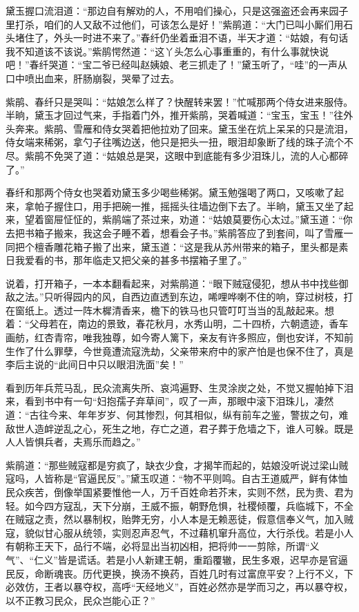 \documentclass[12pt,oneside]{book}
\begin{document}
黛玉握口流泪道：“那边自有解劝的人，不用咱们操心，只是这强盗还会再来园子里打杀，咱们的人又敌不过他们，可该怎么是好！”紫鹃道：“大门已叫小厮们用石头堵住了，外头一时进不来了。”春纤仍坐着垂泪不语，半天才道：“姑娘，有句话我不知道该不该说。”紫鹃愕然道：“这丫头怎么心事重重的，有什么事就快说吧！”春纤哭道：“宝二爷已经叫赵姨娘、老三抓走了！”黛玉听了，“哇”的一声从口中喷出血来，肝肠崩裂，哭晕了过去。

紫鹃、春纤只是哭叫：“姑娘怎么样了？快醒转来罢！”忙喊那两个侍女进来服侍。半晌，黛玉才回过气来，手指着门外，推开紫鹃，哭着喊道：“宝玉，宝玉！”往外头奔来。紫鹃、雪雁和侍女哭着把他拉劝了回来。黛玉坐在炕上呆呆的只是流泪，侍女端来稀粥，拿勺子往嘴边送，他只是把头一扭，眼泪却象断了线的珠子流个不尽。紫鹃不免哭了道：“姑娘总是哭，这眼中到底能有多少泪珠儿，流的人心都碎了。”

春纤和那两个侍女也哭着劝黛玉多少喝些稀粥。黛玉勉强喝了两口，又咳嗽了起来，拿帕子握住口，用手把碗一推，摇摇头往墙边倒下去了。半晌，黛玉又坐了起来，望着窗屉怔怔的，紫鹃端了茶过来，劝道：“姑娘莫要伤心太过。”黛玉道：“你去把书箱子搬来，我这会子睡不着，想看会子书。”紫鹃答应了到套间，叫了雪雁一同把个檀香雕花箱子搬了出来，黛玉道：“这是我从苏州带来的箱子，里头都是素日我爱看的书，那年临走又把父亲的甚多书摆箱子里了。”

说着，打开箱子，一本本翻看起来，对紫鹃道：“眼下贼寇侵犯，想从书中找些御敌之法。”只听得园内的风，自西边直透到东边，唏哩哗喇不住的响，穿过树枝，打在窗纸上。透过一阵木樨清香来，檐下的铁马也只管叮叮当当的乱敲起来。想着：“父母若在，南边的景致，春花秋月，水秀山明，二十四桥，六朝遗迹，香车画舫，红杏青帘，唯我独尊，如今寄人篱下，亲友有许多照应，倒也安详，不知前生作了什么罪孽，今世竟遭流寇洗劫，父亲带来府中的家产怕是也保不住了，真是李后主说的“此间日中只以眼泪洗面”矣！”

看到历年兵荒马乱，民众流离失所、哀鸿遍野、生灵涂炭之处，不觉又握帕掉下泪来，看到书中有一句“妇抱孺子弃草间”，叹了一声，那眼中滚下泪珠儿，凄然道：“古往今来、年年岁岁、何其惨烈，何其相似，纵有前车之鉴，警拔之句，难敌世人造衅逆乱之心，死生之地，存亡之道，君子葬于危墙之下，谁人可躲。既是人人皆惧兵者，夫焉乐而趋之。”

紫鹃道：“那些贼寇都是穷疯了，缺衣少食，才揭竿而起的，姑娘没听说过梁山贼寇吗，人皆称是“官逼民反”。”黛玉叹道：“物不平则鸣。自古王道威严，鲜有体恤民众疾苦，倒像举国紧要惟他一人，万千百姓命若芥末，实则不然，民为贵、君为轻。如今四方寇乱，天下分崩，王威不振，朝野危惧，社稷倾覆，兵临城下，不全在贼寇之责，然以暴制权，贻弊无穷，小人本是无赖恶徒，假意信奉义气，加入贼寇，貌似甘心服从统领，实则忍声忍气，不过藉机窜升高位，大行杀伐。若是小人有朝称王天下，品行不端，必将显出当初凶相，把将帅一一剪除，所谓“义气”、“仁义”皆是谎话。若是小人新建王朝，重蹈覆辙，民生多艰，迟早亦是官逼民反，命断魂丧。历代更换，换汤不换药，百姓几时有过富庶平安？上行不义，下必效仿，王者以暴夺权，高呼“天经地义”，百姓必然亦是学而习之，再以暴夺权，以不正教习民众，民众岂能心正？”
\end{document}
